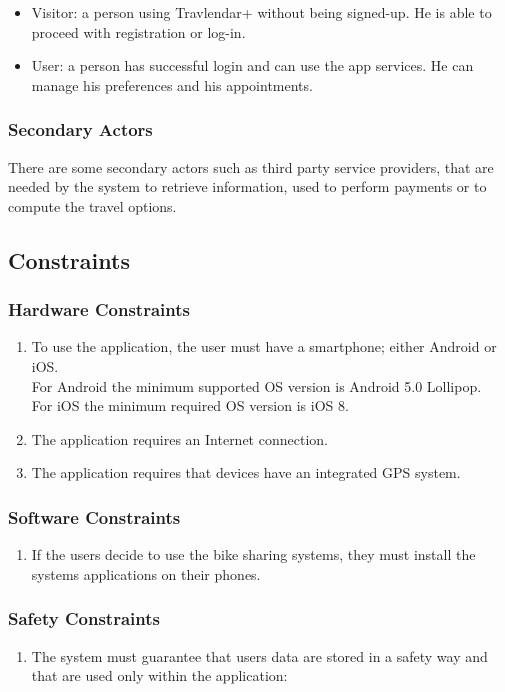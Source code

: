 \renewcommand{\labelitemi}{$-$}
\begin{itemize}
\item
Visitor: a person using Travlendar+ without being signed-up. He is able to proceed with registration or log-in.
\item
User: a person has successful login and can use the app services. He can manage his preferences and his appointments.
\end{itemize}

\subsubsection{Secondary Actors}
There are some secondary actors such as third party service providers, that are needed by the system to retrieve information, used to perform payments or to compute the travel options. 


\subsection{Constraints}
\subsubsection{Hardware Constraints}
\begin{enumerate}
\item
To use the application, the user must have a smartphone; either Android or iOS.\\
For Android the minimum supported OS version is Android 5.0 Lollipop.\\
For iOS the minimum required OS version is iOS 8.
\item
The application requires an Internet connection.
\item
The application requires that devices have an integrated GPS system.
\end{enumerate}

\subsubsection{Software Constraints}
\begin{enumerate}
\item
If the users decide to use the bike sharing systems, they must install the systems applications on their phones.
\end{enumerate}

\subsubsection{Safety Constraints}
\begin{enumerate}
\item
The system must guarantee that users data are stored in a safety way and that are used only within the application:
\end{enumerate}

